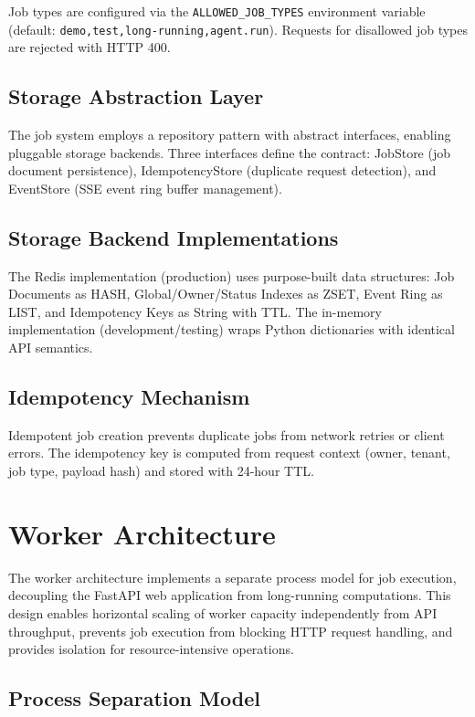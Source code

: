 \documentclass[a4paper,twoside]{sapthesis}
\begin{document}
Job types are configured via the \texttt{ALLOWED\_JOB\_TYPES} environment variable (default: \texttt{demo,test,long-running,agent.run}). Requests for disallowed job types are rejected with HTTP 400.

\subsection{Storage Abstraction Layer}

The job system employs a repository pattern with abstract interfaces, enabling pluggable storage backends. Three interfaces define the contract: JobStore (job document persistence), IdempotencyStore (duplicate request detection), and EventStore (SSE event ring buffer management).

\subsection{Storage Backend Implementations}

The Redis implementation (production) uses purpose-built data structures: Job Documents as HASH, Global/Owner/Status Indexes as ZSET, Event Ring as LIST, and Idempotency Keys as String with TTL. The in-memory implementation (development/testing) wraps Python dictionaries with identical API semantics.

\subsection{Idempotency Mechanism}

Idempotent job creation prevents duplicate jobs from network retries or client errors. The idempotency key is computed from request context (owner, tenant, job type, payload hash) and stored with 24-hour TTL.

\section{Worker Architecture}
\label{sec:worker-arch}

The worker architecture implements a separate process model for job execution, decoupling the FastAPI web application from long-running computations. This design enables horizontal scaling of worker capacity independently from API throughput, prevents job execution from blocking HTTP request handling, and provides isolation for resource-intensive operations.

\subsection{Process Separation Model}
\end{document}
